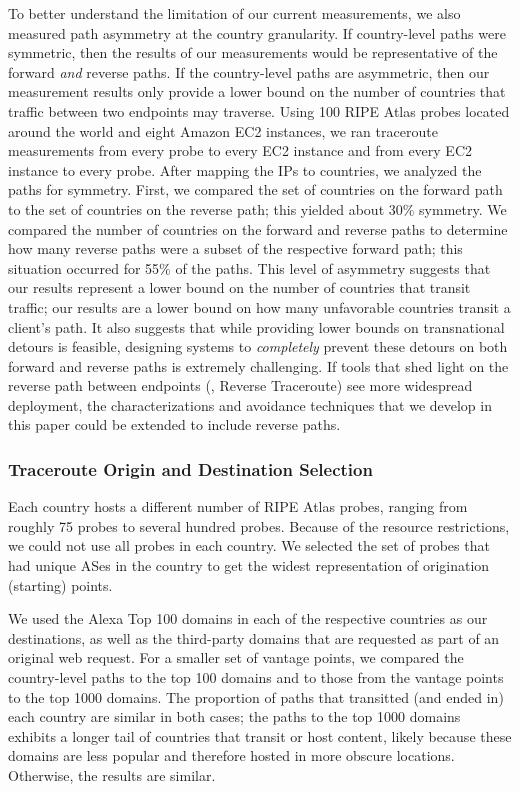 To better understand the limitation of our current measurements, we also
measured path asymmetry at the country granularity. If country-level paths
were symmetric, then the results of our measurements would be representative
of the forward {\it and} reverse paths. If the country-level paths are
asymmetric, then our measurement results only provide a lower bound on the
number of countries that traffic between two endpoints may traverse.  Using
100 RIPE Atlas probes located around the world and eight Amazon EC2 instances,
we ran traceroute measurements from every probe to every EC2 instance and from
every EC2 instance to every probe.  After mapping the IPs to countries, we
analyzed the paths for symmetry.  First, we compared the set of countries on
the forward path to the set of countries on the reverse path; this yielded
about 30\% symmetry.  We compared the number of countries on the forward and
reverse paths to determine how many reverse paths were a subset of the
respective forward path; this situation occurred for 55\% of the paths. This
level of asymmetry suggests that our results represent a lower bound on the
number of countries that transit traffic; our results are a lower bound on how
many unfavorable countries transit a client's path. It also suggests that
while providing lower bounds on transnational detours is feasible, designing
systems to {\em completely} prevent these detours on both forward and reverse
paths is extremely challenging. If tools that shed light on the reverse path
between endpoints (\eg, Reverse Traceroute) see more widespread deployment,
the characterizations and avoidance techniques that we develop in this paper could
be extended to include reverse paths.

\subsubsection{Traceroute Origin and Destination Selection}

Each country hosts a different number of RIPE Atlas probes, ranging
from roughly 75 probes to several hundred probes.  Because of the resource
restrictions, we could not use all probes in each country.  We
selected the set of probes that had unique ASes in the country to get
the widest representation of origination (starting) points.

We used the Alexa Top 100 domains in each of the respective countries as our
destinations, as well as the third-party domains that are requested as part of
an original web request.  For a smaller set of vantage points, we compared the
country-level paths to the top 100 domains and to those from the vantage
points to the top 1000 domains. The proportion of paths that transitted (and
ended in) each country are similar in both cases; the paths to the top 1000
domains exhibits a longer tail of countries that transit or host content,
likely because these domains are less popular and therefore hosted in more
obscure locations. Otherwise, the results are similar.

